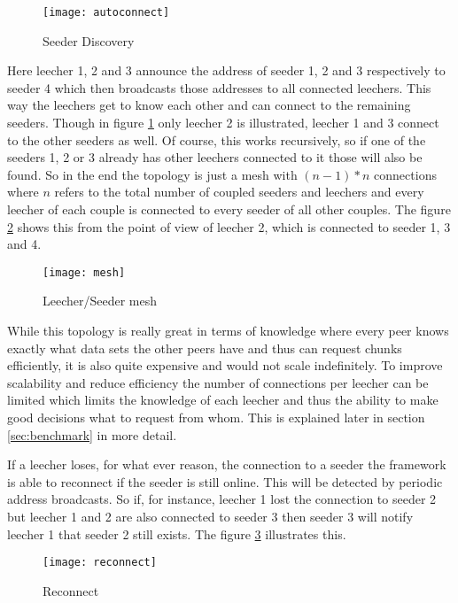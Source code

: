 \begin{figure}[H]
\centering
\texttt{[image: autoconnect]}
\caption{Seeder Discovery}
\label{fig:autoconnect}
\end{figure}

Here leecher 1, 2 and 3 announce the address of seeder 1, 2 and 3 respectively to seeder 4 which then broadcasts those addresses to all connected leechers. This way the leechers get to know each other and can connect to the remaining seeders. Though in figure \ref{fig:autoconnect} only leecher 2 is illustrated, leecher 1 and 3 connect to the other seeders as well. Of course, this works recursively, so if one of the seeders 1, 2 or 3 already has other leechers connected to it those will also be found. So in the end the topology is just a mesh with $(n-1)*n$ connections where $n$ refers to the total number of coupled seeders and leechers and every leecher of each couple is connected to every seeder of all other couples. The figure \ref{fig:mesh} shows this from the point of view of leecher 2, which is connected to seeder 1, 3 and 4.

\begin{figure}[H]
\centering
\texttt{[image: mesh]}
\caption{Leecher/Seeder mesh}
\label{fig:mesh}
\end{figure}

While this topology is really great in terms of knowledge where every peer knows exactly what data sets the other peers have and thus can request chunks efficiently, it is also quite expensive and would not scale indefinitely. To improve scalability and reduce efficiency the number of connections per leecher can be limited which limits the knowledge of each leecher and thus the ability to make good decisions what to request from whom. This is explained later in section \ref{sec:benchmark} in more detail.

If a leecher loses, for what ever reason, the connection to a seeder the framework is able to reconnect if the seeder is still online. This will be detected by periodic address broadcasts. So if, for instance, leecher 1 lost the connection to seeder 2 but leecher 1 and 2 are also connected to seeder 3 then seeder 3 will notify leecher 1 that seeder 2 still exists. The figure \ref{fig:reconnect} illustrates this.

\begin{figure}[H]
\centering
\texttt{[image: reconnect]}
\caption{Reconnect}
\label{fig:reconnect}
\end{figure}


